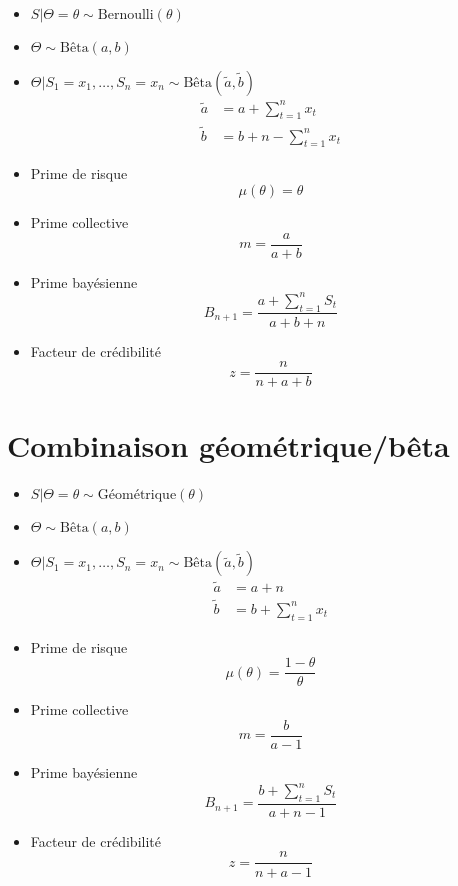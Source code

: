 \begin{itemize}
\item $S|\Theta = \theta \sim \text{Bernoulli}(\theta)$
\item $\Theta \sim \text{Bêta}(a, b)$
\item $\Theta|S_1 = x_1, \dots, S_n = x_n \sim \text{Bêta}(\tilde{a},
  \tilde{b})$
  \begin{align*}
    \tilde{a} &= a + \sum_{t = 1}^n x_t \\
    \tilde{b} &= b + n - \sum_{t = 1}^n x_t
  \end{align*}
\item Prime de risque
  \begin{equation*}
    \mu(\theta) = \theta
  \end{equation*}
\item Prime collective
  \begin{equation*}
    m = \frac{a}{a + b}
  \end{equation*}
\item Prime bayésienne
  \begin{equation*}
    B_{n + 1} = \frac{a + \sum_{t = 1}^n S_t}{a + b + n}
  \end{equation*}
\item Facteur de crédibilité
  \begin{equation*}
    z = \frac{n}{n + a + b}
  \end{equation*}
\end{itemize}


\section{Combinaison géométrique/bêta}

\begin{itemize}
\item $S|\Theta = \theta \sim \text{Géométrique}(\theta)$
\item $\Theta \sim \text{Bêta}(a, b)$
\item $\Theta|S_1 = x_1, \dots, S_n = x_n \sim
  \text{Bêta}(\tilde{a}, \tilde{b})$
  \begin{align*}
    \tilde{a} &= a + n \\
    \tilde{b} &= b + \sum_{t = 1}^n x_t
  \end{align*}
\item Prime de risque
  \begin{equation*}
    \mu(\theta) = \frac{1 - \theta}{\theta}
  \end{equation*}
\item Prime collective
  \begin{equation*}
    m = \frac{b}{a - 1}
  \end{equation*}
\item Prime bayésienne
  \begin{equation*}
    B_{n + 1} = \frac{b + \sum_{t = 1}^n S_t}{a + n - 1}
  \end{equation*}
\item Facteur de crédibilité
  \begin{equation*}
    z = \frac{n}{n + a - 1}
  \end{equation*}
\end{itemize}

